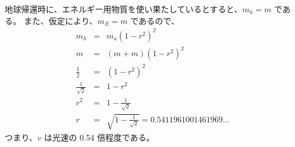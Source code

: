 地球帰還時に、エネルギー用物質を使い果たしているとすると、$m_h = m$ である。
また、仮定により、$m_E = m$ であるので、
  \begin{eqnarray}
    m_h & = & m_a(1 - r^2)^2
  \\
    m & = & (m + m) (1-r^2)^2
  \\
    \frac{1}{2} & = & (1-r^2)^2
  \\
    \frac{1}{\sqrt{2}} & = & 1-r^2
  \\
    r^2 & = & 1 - \frac{1}{\sqrt{2}}
  \\
    r & = & \sqrt{1 - \frac{1}{\sqrt{2}}} = 0.5411961001461969...
  \end{eqnarray}
つまり、$v$ は光速の 0.54 倍程度である。
